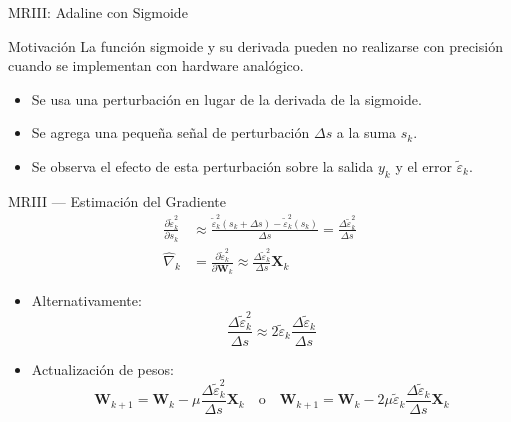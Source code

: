 \documentclass[aspectratio=169,utf8,spanish]{beamer}
\begin{document}
\begin{frame}{MRIII: Adaline con Sigmoide}
  \begin{block}{Motivación}
    La función sigmoide y su derivada pueden no realizarse con precisión cuando se implementan con hardware analógico.
  \end{block}

  \begin{itemize}
    \item Se usa una perturbación en lugar de la derivada de la sigmoide.
    \item Se agrega una pequeña señal de perturbación $\Delta s$ a la suma $s_k$.
    \item Se observa el efecto de esta perturbación sobre la salida $y_k$ y el error $\tilde{\varepsilon}_k$.
  \end{itemize}
\end{frame}

\begin{frame}{MRIII — Estimación del Gradiente}
  \begin{align*}
    \frac{\partial \tilde{\varepsilon}_k^2}{\partial s_k} &\approx \frac{\tilde{\varepsilon}_k^2(s_k + \Delta s) - \tilde{\varepsilon}_k^2(s_k)}{\Delta s} = \frac{\Delta\tilde{\varepsilon}_k^2}{\Delta s} \\[4pt]
    \hat{\nabla}_k &= \frac{\partial \tilde{\varepsilon}_k^2}{\partial \mathbf{W}_k} \approx \frac{\Delta\tilde{\varepsilon}_k^2}{\Delta s} \mathbf{X}_k
  \end{align*}

  \begin{itemize}
    \item Alternativamente:
    \begin{equation*}
      \frac{\Delta\tilde{\varepsilon}_k^2}{\Delta s} \approx 2\tilde{\varepsilon}_k \frac{\Delta\tilde{\varepsilon}_k}{\Delta s}
    \end{equation*}
    \item Actualización de pesos:
    \begin{equation*}
      \mathbf{W}_{k+1} = \mathbf{W}_k - \mu \frac{\Delta\tilde{\varepsilon}_k^2}{\Delta s} \mathbf{X}_k
      \quad\text{o}\quad
      \mathbf{W}_{k+1} = \mathbf{W}_k - 2\mu\tilde{\varepsilon}_k \frac{\Delta\tilde{\varepsilon}_k}{\Delta s} \mathbf{X}_k
    \end{equation*}
  \end{itemize}
\end{frame}
\end{document}
